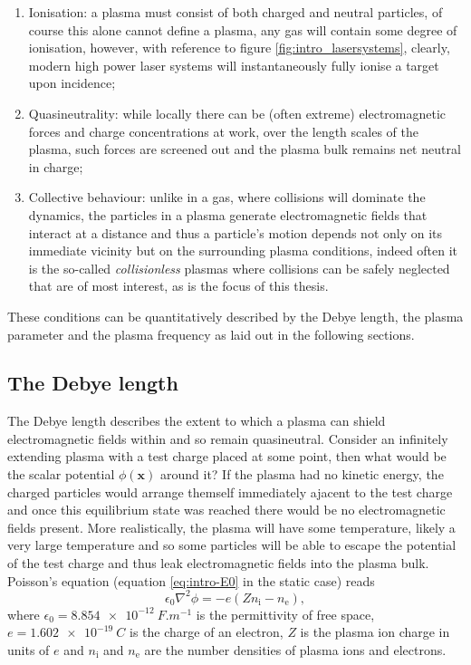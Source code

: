 \begin{enumerate}
	\item Ionisation: a plasma must consist of both charged and neutral particles, of course this alone cannot define a plasma, any gas will contain some degree of ionisation, however, with reference to figure \ref{fig:intro_lasersystems}, clearly, modern high power laser systems will instantaneously fully ionise a target upon incidence;
	\item Quasineutrality: while locally there can be (often extreme) electromagnetic forces and charge concentrations at work, over the length scales of the plasma, such forces are screened out and the plasma bulk remains net neutral in charge;
	\item Collective behaviour: unlike in a gas, where collisions will dominate the dynamics, the particles in a plasma generate electromagnetic fields that interact at a distance and thus a particle's motion depends not only on its immediate vicinity but on the surrounding plasma conditions, indeed often it is the so-called \textit{collisionless} plasmas where collisions can be safely neglected that are of most interest, as is the focus of this thesis.
\end{enumerate}

These conditions can be quantitatively described by the Debye length, the plasma parameter and the plasma frequency as laid out in the following sections.

\subsection{\label{sec:debye_length}The Debye length}
The Debye length describes the extent to which a plasma can shield electromagnetic fields within and so remain quasineutral. Consider an infinitely extending plasma with a test charge placed at some point, then what would be the scalar potential $\phi(\mathbf{x})$ around it? If the plasma had no kinetic energy, the charged particles would arrange themself immediately ajacent to the test charge and once this equilibrium state was reached there would be no electromagnetic fields present. More realistically, the plasma will have some temperature, likely a very large temperature and so some particles will be able to escape the potential of the test charge and thus leak electromagnetic fields into the plasma bulk. Poisson's equation (equation \ref{eq:intro-E0} in the static case) reads
\begin{equation}\label{eq:poisson}
	\epsilon_0\nabla^2\phi = -e(Zn_\mathrm{i} - n_\mathrm{e}),
\end{equation}
where $\epsilon_0 = \qty{8.854e-12}{F.m^{-1}}$ is the permittivity of free space, $e = \qty{1.602e-19}{C}$ is the charge of an electron, $Z$ is the plasma ion charge in units of $e$ and $n_\mathrm{i}$ and $n_\mathrm{e}$ are the number densities of plasma ions and electrons.

